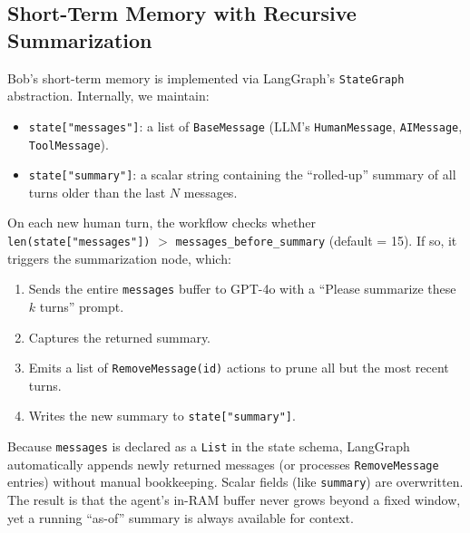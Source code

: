 \documentclass[conference]{IEEEtran}
\begin{document}
\subsection{Short-Term Memory with Recursive Summarization}
Bob’s short-term memory is implemented via LangGraph’s \texttt{StateGraph} abstraction. Internally, we maintain:
\begin{itemize}[leftmargin=*]
  \item \texttt{state["messages"]}: a list of \texttt{BaseMessage} (LLM’s \texttt{HumanMessage}, \texttt{AIMessage}, \texttt{ToolMessage}).
  \item \texttt{state["summary"]}: a scalar string containing the “rolled-up” summary of all turns older than the last $N$ messages.
\end{itemize}

On each new human turn, the workflow checks whether \\
 \texttt{len(state["messages"])} $>$ \texttt{messages\_before\_summary} (default = 15). 
If so, it triggers the summarization node, which:
\begin{enumerate}[leftmargin=*]
  \item Sends the entire \texttt{messages} buffer to GPT-4o with a “Please summarize these $k$ turns” prompt.
  \item Captures the returned summary.
  \item Emits a list of \texttt{RemoveMessage(id)} actions to prune all but the most recent turns.
  \item Writes the new summary to \texttt{state["summary"]}.
\end{enumerate}

Because \texttt{messages} is declared as a \texttt{List} in the state schema, 
LangGraph automatically appends newly returned messages 
(or processes \texttt{RemoveMessage} entries) without manual bookkeeping. 
Scalar fields (like \texttt{summary}) are overwritten. 
The result is that the agent’s in-RAM buffer never grows beyond a 
fixed window, yet a running “as-of” summary is always available for context.
\end{document}
